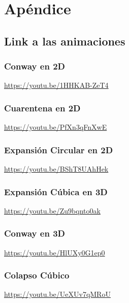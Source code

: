 \section{Apéndice}\label{sec:apendice}

\subsection{Link a las animaciones}\label{subsec:link-animaciones}

\begin{appendices}
    \subsubsection{Conway en 2D}\label{subsubsec:conway-en-2d-link}
    \url{https://youtu.be/1HHKAB-ZeT4}
    \subsubsection{Cuarentena en 2D}\label{subsubsec:cuarentena-2d-link}
    \url{https://youtu.be/PfXn3qFnXwE}
    \subsubsection{Expansión Circular en 2D}\label{subsubsec:expansion-circular-2d-link}
    \url{https://youtu.be/BShT8UAhHek}
    \subsubsection{Expansión Cúbica en 3D}\label{subsubsec:cubito-3d-link}
    \url{https://youtu.be/Zu9bqnto0ak}
    \subsubsection{Conway en 3D}\label{subsubsec:conway-en-3d-link}
    \url{https://youtu.be/HlUXy0G1ep0}
    \subsubsection{Colapso Cúbico}\label{subsubsec:colapso-cubico-link}
    \url{https://youtu.be/UeXUv7qMRoU}
\end{appendices}
